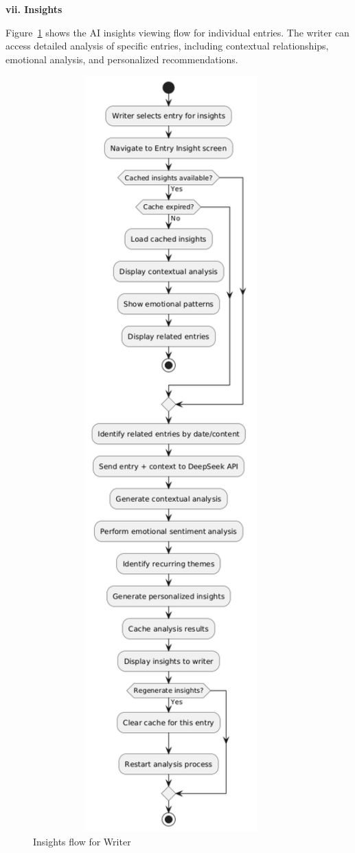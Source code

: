 \textbf{vii. Insights}


Figure~\ref{fig:insights-flow} shows the AI insights viewing flow for individual entries. The writer can access detailed analysis of specific entries, including contextual relationships, emotional analysis, and personalized recommendations.

\begin{figure}[H]
\centering
\includegraphics[width=0.95\textwidth,height=0.7\textheight,keepaspectratio]{files/imgs/insights_flow.png}
\caption{Insights flow for Writer}
\label{fig:insights-flow}
\end{figure}
\clearpage

